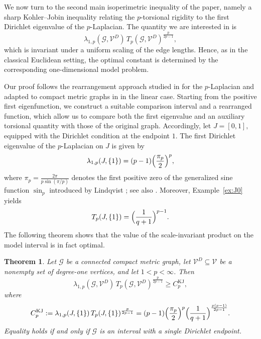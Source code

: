 \documentclass[12pt,a4paper]{article}
\numberwithin{equation}{section}
\newtheorem{theorem}{Theorem}[section]
\begin{document}
	We now turn to the second main isoperimetric inequality of the paper,
	namely a sharp Kohler--Jobin inequality relating the $p$-torsional
	rigidity to the first Dirichlet eigenvalue of the $p$-Laplacian.
	The quantity we are interested in is
	\[
	\lambda_{1,p}(\mathcal G,\mathcal V^D)\,
	T_p(\mathcal G,\mathcal V^D)^{\frac{p}{2p-1}},
	\]
	which is invariant under a uniform scaling of the edge lengths. Hence,
	as in the classical Euclidean setting, the optimal constant is determined
	by the corresponding one-dimensional model problem.
	
	Our proof follows the rearrangement approach studied in \cite{Brasco} for the
	$p$-Laplacian and adapted to compact metric graphs in \cite{MuPl}
	in the linear case. Starting from the positive first eigenfunction, we construct a suitable comparison
	interval and a rearranged function, which allow us to compare both the first
	eigenvalue and an auxiliary torsional quantity with those of the original
	graph.
	Accordingly, let
	\(
	J=[0,1],
	\)
	equipped with the Dirichlet condition at the endpoint $1$. The first
	Dirichlet eigenvalue of the $p$-Laplacian on $J$ is given by
	\[
	\lambda_{1,p}(J,\{1\})
	=
	(p-1)\Bigl(\frac{\pi_p}{2}\Bigr)^p,
	\]
	where
	\(
	\pi_p=\frac{2\pi}{p\sin(\pi/p)}
	\)
	denotes the first positive zero of the generalized sine function
	$\sin_p$ introduced by Lindqvist \cite{Lindqvist}; see also
	\cite{LE11}. Moreover, Example~\ref{ex:J0} yields
	\[
	T_p(J,\{1\})
	=
	\Bigl(\frac{1}{q+1}\Bigr)^{p-1}.
	\]
	The following theorem shows that the value of the scale-invariant product on
	the model interval is in fact optimal.
	
	
	\begin{theorem}
		\label{thm:KJ}
		Let $\mathcal G$ be a connected compact metric graph,
		let $\mathcal V^D\subseteq\mathcal V$ be a nonempty set of degree-one
		vertices, and let $1<p<\infty$. Then
		\begin{equation}
			\label{eq:KJ}
			\lambda_{1,p}(\mathcal G,\mathcal V^D)\,
			T_p(\mathcal G,\mathcal V^D)^{\frac{p}{2p-1}}
			\ge
			C_p^{\mathrm{KJ}},
		\end{equation}
		where 
		\begin{equation}	\label{def:KJconst}
			C_p^{\mathrm{KJ}}
			:=
			\lambda_{1,p}(J,\{1\})
			\,T_p(J,\{1\})^{\frac{p}{2p-1}}
			=
			(p-1)
			\Bigl(\frac{\pi_p}{2}\Bigr)^p
			\Bigl(\frac{1}{q+1}\Bigr)^{\frac{p(p-1)}{2p-1}}.
		\end{equation}
		Equality holds if and only if $\mathcal G$ is an interval with a single Dirichlet endpoint.
	\end{theorem}
	
\end{document}
